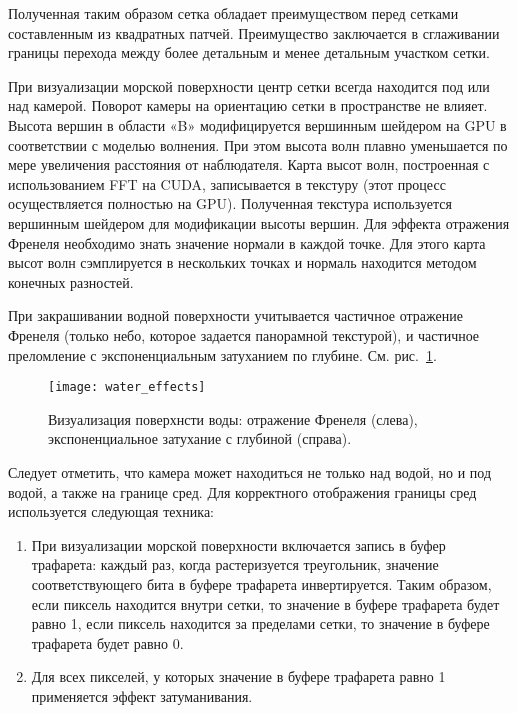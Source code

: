 Полученная таким образом сетка обладает преимуществом перед сетками составленным из квадратных патчей. Преимущество заключается в сглаживании границы перехода между более детальным и менее детальным участком сетки.

При визуализации морской поверхности центр сетки всегда находится под или над камерой. Поворот камеры на ориентацию сетки в пространстве не влияет. Высота вершин в области «B» модифицируется вершинным шейдером на GPU в соответствии с моделью волнения. При этом высота волн плавно уменьшается по мере увеличения расстояния от наблюдателя. Карта высот волн, построенная с использованием FFT на CUDA, записывается в текстуру (этот процесс осуществляется полностью на GPU). Полученная текстура используется вершинным шейдером для модификации высоты вершин. Для эффекта отражения Френеля необходимо знать значение нормали в каждой точке. Для этого карта высот волн сэмплируется в нескольких точках и нормаль находится методом конечных разностей.



При закрашивании водной поверхности учитывается частичное отражение Френеля (только небо, которое задается панорамной текстурой), 
и частичное преломление с экспоненциальным затуханием по глубине. См. рис.~\ref{water_effects}.

\begin{figure}[ht]
\begin{center}
\texttt{[image: water\_effects]}
\end{center}
\caption{Визуализация поверхнсти воды: отражение Френеля (слева), экспоненциальное затухание с глубиной (справа).}
\label{water_effects}
\end{figure}



Следует отметить, что камера может находиться не только над водой, но и под водой, а также на границе сред. Для корректного отображения границы сред используется следующая техника:
\begin{enumerate}
\item	При визуализации морской поверхности включается запись в буфер трафарета: каждый раз, когда растеризуется треугольник, значение соответствующего бита в буфере трафарета инвертируется. Таким образом, если пиксель находится внутри сетки, то значение в буфере трафарета будет равно 1, 
если пиксель находится за пределами сетки, то значение в буфере трафарета будет равно 0.
\item	Для всех пикселей, у которых значение в буфере трафарета равно 1 применяется эффект затуманивания.
\end{enumerate}

